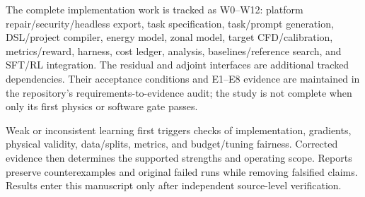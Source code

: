 The complete implementation work is tracked as W0--W12: platform repair/security/headless export, task specification, task/prompt generation, DSL/project compiler, energy model, zonal model, target CFD/calibration, metrics/reward, harness, cost ledger, analysis, baselines/reference search, and SFT/RL integration. The residual and adjoint interfaces are additional tracked dependencies. Their acceptance conditions and E1--E8 evidence are maintained in the repository's requirements-to-evidence audit; the study is not complete when only its first physics or software gate passes.

Weak or inconsistent learning first triggers checks of implementation, gradients, physical validity, data/splits, metrics, and budget/tuning fairness. Corrected evidence then determines the supported strengths and operating scope. Reports preserve counterexamples and original failed runs while removing falsified claims. Results enter this manuscript only after independent source-level verification.

